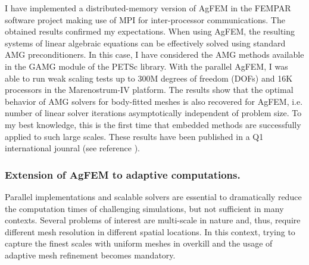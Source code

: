 \documentclass{article}
\begin{document}
I have implemented a distributed-memory version of AgFEM in the FEMPAR software project  making use of MPI for inter-processor communications. The obtained results confirmed my expectations. When using AgFEM, the resulting systems of linear algebraic equations can be effectively solved using standard AMG preconditioners. In this case, I have considered the AMG methods available in the GAMG module of the PETSc library. {{With the parallel AgFEM, I was able to run  weak scaling tests up to  300M degrees of freedom (DOFs) and 16K processors in the Marenostrum-IV platform}}. The results show that the optimal behavior of AMG solvers for body-fitted meshes is also recovered for AgFEM, i.e. number of linear solver iterations asymptotically independent of problem size. To my best knowledge, this is the first time that embedded methods are successfully applied to such large scales. These results have been published in a { Q1 international jounral} (see reference \cite{verdugo_2019}).

\subsubsection{Extension of AgFEM to adaptive computations.}


Parallel implementations and scalable solvers are essential to dramatically reduce the computation times of challenging simulations, but not sufficient in many contexts. Several problems of interest are multi-scale in nature and, thus, require different mesh resolution in different spatial locations. In this context, trying to capture the finest scales with uniform meshes in overkill and the usage of adaptive mesh refinement becomes mandatory.
\end{document}
